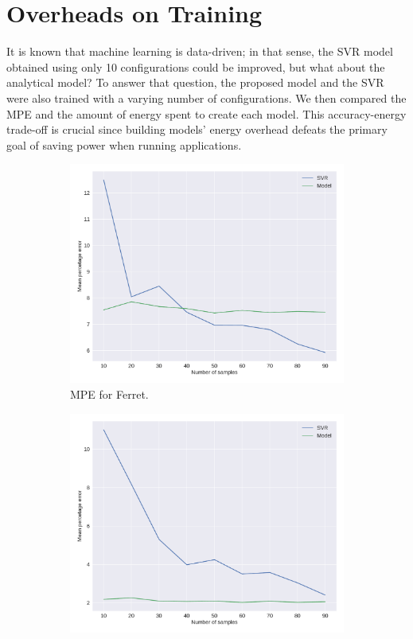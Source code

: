 \section{Overheads on Training} \label{subsec:overhead}
It is known that machine learning is data-driven; in that sense, the SVR model obtained using only 10 configurations could be improved, but what about the analytical model? 
To answer that question, the proposed model and the SVR were also trained with a varying number of configurations.
We then compared the MPE and the amount of energy spent to create each model. 
This accuracy-energy trade-off is crucial since building models' energy overhead defeats the primary goal of saving power when running applications.
\enlargethispage{.5cm}

\begin{figure}[H]
	\centering
	\captionsetup[subfigure]{justification=centering}
	\begin{subfigure}[b]{0.45\textwidth}
		\centerline{\includegraphics[width=\columnwidth]{models/figures/overhead/completo_ferret_4.pdf}}
		\caption{MPE for Ferret.}
		\label{fig:overhead_ferret}
	\end{subfigure}
	\begin{subfigure}[b]{0.45\textwidth}
		\centerline{\includegraphics[width=\columnwidth]{models/figures/overhead/completo_black_6.pdf}}

\end{subfigure}
\end{figure}
